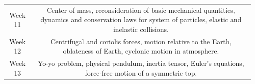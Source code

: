 \documentclass[11pt]{article}
\begin{document}
\begin{table}[h!]
\begin{tabular}{ | c | c | }
\begin{minipage}{.85\textwidth}
\end{minipage} \\
\hline
Week 11 & \begin{minipage}{.85\textwidth}

	\vspace{1mm}
	Center of mass, reconsideration of basic mechanical quantities, dynamics and conservation laws for system of particles, elastic and inelastic collisions.
	\vspace{1mm}

\end{minipage} \\
\hline
Week 12 & \begin{minipage}{.85\textwidth}

	\vspace{1mm}
	Centrifugal and coriolis forces, motion relative to the Earth, oblateness of Earth, cyclonic motion in atmosphere.
	\vspace{1mm}

\end{minipage} \\
\hline
Week 13 & \begin{minipage}{.85\textwidth}

	\vspace{1mm}
	Yo-yo problem, physical pendulum, inertia tensor, Euler's equations, force-free motion of a symmetric top.
	\vspace{1mm}

\end{minipage} \\
\hline

\end{tabular} 
\end{table}

\newpage
\end{document}
